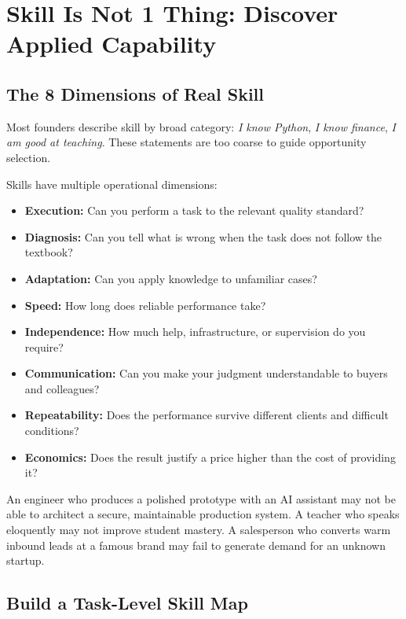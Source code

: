 \section{Skill Is Not 1 Thing: Discover Applied Capability}

\subsection{The 8 Dimensions of Real Skill}

Most founders describe skill by broad category: \textit{I know Python}, \textit{I know finance}, \textit{I am good at teaching}. These statements are too coarse to guide opportunity selection.

Skills have multiple operational dimensions:

\begin{itemize}[leftmargin=11pt,itemsep=1.5pt,topsep=1.5pt,parsep=0pt]
  \item \textbf{Execution:} Can you perform a task to the relevant quality standard?
  \item \textbf{Diagnosis:} Can you tell what is wrong when the task does not follow the textbook?
  \item \textbf{Adaptation:} Can you apply knowledge to unfamiliar cases?
  \item \textbf{Speed:} How long does reliable performance take?
  \item \textbf{Independence:} How much help, infrastructure, or supervision do you require?
  \item \textbf{Communication:} Can you make your judgment understandable to buyers and colleagues?
  \item \textbf{Repeatability:} Does the performance survive different clients and difficult conditions?
  \item \textbf{Economics:} Does the result justify a price higher than the cost of providing it?
\end{itemize}

An engineer who produces a polished prototype with an AI assistant may not be able to architect a secure, maintainable production system. A teacher who speaks eloquently may not improve student mastery. A salesperson who converts warm inbound leads at a famous brand may fail to generate demand for an unknown startup.

\subsection{Build a Task-Level Skill Map}

